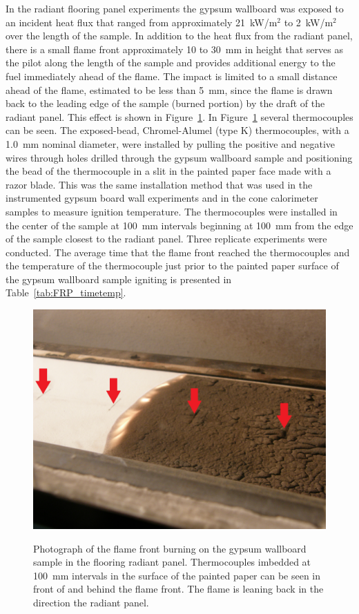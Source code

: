 \documentclass[twoside]{uocthesis}
\begin{document}
In the radiant flooring panel experiments the gypsum wallboard was exposed to an incident heat flux that ranged from approximately 21~kW/m$^2$ to 2~kW/m$^2$ over the length of the sample. In addition to the heat flux from the radiant panel, there is a small flame front approximately 10 to 30~mm in height that serves as the pilot along the length of the sample and provides additional energy to the fuel immediately ahead of the flame.  The impact is limited to a small distance ahead of the flame, estimated to be less than 5~mm, since the flame is drawn back to the leading edge of the sample (burned portion) by the draft of the radiant panel.  This effect is shown in Figure~\ref{FRP_flamefront_arrows}. In Figure~\ref{FRP_flamefront_arrows} several thermocouples can be seen. The exposed-bead, Chromel-Alumel (type K) thermocouples, with a 1.0~mm nominal diameter, were installed by pulling the positive and negative wires through holes drilled through the gypsum wallboard sample and positioning the bead of the thermocouple in a slit in the painted paper face made with a razor blade.  This was the same installation method that was used in the instrumented gypsum board wall experiments and in the cone calorimeter samples to measure ignition temperature.  The thermocouples were installed in the center of the sample at 100~mm intervals beginning at 100~mm from the edge of the sample closest to the radiant panel.  Three replicate experiments were conducted.  The average time that the flame front reached the thermocouples and the temperature of the thermocouple just prior to the painted paper surface of the gypsum wallboard sample igniting is presented in Table~\ref{tab:FRP_timetemp}.  

\begin{figure}
	\centering
	\includegraphics[width=\textwidth]{../Figures/FRP_flamefront_arrows} \\
	\caption[Photograph of the flame front burning on the gypsum wallboard sample in the flooring radiant panel] {Photograph of the flame front burning on the gypsum wallboard sample in the flooring radiant panel. Thermocouples imbedded at 100~mm intervals in the surface of the painted paper can be seen in front of and behind the flame front. The flame is leaning back in the direction the radiant panel.}
	\label{FRP_flamefront_arrows}
\end{figure}
\end{document}
